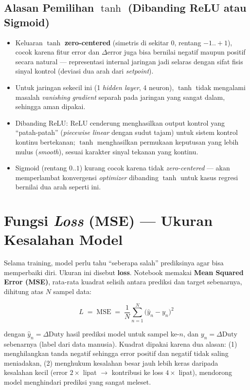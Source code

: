 \documentclass[11pt,a4paper]{article}
\begin{document}
\subsection{Alasan Pemilihan $\tanh$ (Dibanding ReLU atau Sigmoid)}

\begin{itemize}[nosep]
  \item Keluaran $\tanh$ \textbf{zero-centered} (simetris di sekitar 0, rentang
  $-1..+1$), cocok karena fitur $\mathrm{error}$ dan $\Delta\mathrm{error}$ juga bisa
  bernilai negatif maupun positif secara natural --- representasi internal jaringan jadi
  selaras dengan sifat fisis sinyal kontrol (deviasi dua arah dari \emph{setpoint}).
  \item Untuk jaringan sekecil ini (1 \emph{hidden layer}, 4 neuron), $\tanh$ tidak
  mengalami masalah \emph{vanishing gradient} separah pada jaringan yang sangat dalam,
  sehingga aman dipakai.
  \item Dibanding ReLU: ReLU cenderung menghasilkan output kontrol yang ``patah-patah''
  (\emph{piecewise linear} dengan sudut tajam) untuk sistem kontrol kontinu bertekanan;
  $\tanh$ menghasilkan permukaan keputusan yang lebih mulus (\emph{smooth}), sesuai
  karakter sinyal tekanan yang kontinu.
  \item Sigmoid (rentang $0..1$) kurang cocok karena tidak \emph{zero-centered} --- akan
  memperlambat konvergensi \emph{optimizer} dibanding $\tanh$ untuk kasus regresi
  bernilai dua arah seperti ini.
\end{itemize}

\section{Fungsi \emph{Loss} (MSE) --- Ukuran Kesalahan Model}
\label{sec:loss}

Selama training, model perlu tahu ``seberapa salah'' prediksinya agar bisa memperbaiki
diri. Ukuran ini disebut \textbf{loss}. Notebook memakai \textbf{Mean Squared Error
(MSE)}, rata-rata kuadrat selisih antara prediksi dan target sebenarnya, dihitung atas
$N$ sampel data:

\begin{formulabox}
\[
  L \;=\; \mathrm{MSE} \;=\; \frac{1}{N}\sum_{n=1}^{N}\big(\hat{y}_n - y_n\big)^2
\]
\end{formulabox}

dengan $\hat{y}_n = \Delta\mathrm{Duty}$ hasil prediksi model untuk sampel ke-$n$, dan
$y_n = \Delta\mathrm{Duty}$ sebenarnya (label dari data manusia). Kuadrat dipakai karena
dua alasan: (1) menghilangkan tanda negatif sehingga error positif dan negatif tidak
saling meniadakan, (2) menghukum kesalahan besar jauh lebih keras daripada kesalahan
kecil (error $2\times$ lipat $\to$ kontribusi ke loss $4\times$ lipat), mendorong model
menghindari prediksi yang sangat meleset.
\end{document}
